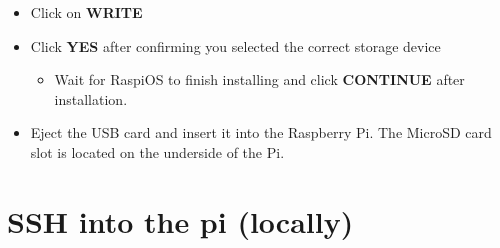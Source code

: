 \documentclass[
  letterpaper,
]{scrbook}
\providecommand{\tightlist}{%
  \setlength{\itemsep}{0pt}\setlength{\parskip}{0pt}}
\begin{document}
\begin{itemize}
\begin{itemize}
    \begin{itemize}
    \tightlist
    \item
      username: apms
    \item
      password: \textless ENTER YOUR PASSWORD\textgreater{}
    \end{itemize}
  \item
    Select ``Configure wireless LAN''

    \begin{itemize}
    \tightlist
    \item
      \textbf{SSID}: apms
    \item
      \textbf{Password}: \textless ENTER YOUR PASSWORD\textgreater{}
    \item
      \textbf{Wireless LAN country}: ZA
    \end{itemize}
  \item
    Select ``Set locale settings''

    \begin{itemize}
    \tightlist
    \item
      \textbf{Time zone}: ZA
    \end{itemize}
  \item
    Leave all other settings unchanged and click on \textbf{SAVE}
  \end{itemize}
\item
  Click on \textbf{WRITE}
\item
  Click \textbf{YES} after confirming you selected the correct storage
  device

  \begin{itemize}
  \tightlist
  \item
    Wait for RaspiOS to finish installing and click \textbf{CONTINUE}
    after installation.
  \end{itemize}
\item
  Eject the USB card and insert it into the Raspberry Pi. The MicroSD
  card slot is located on the underside of the Pi.
\end{itemize}

\section{SSH into the pi (locally)}\label{ssh-into-the-pi-locally}
\end{document}
